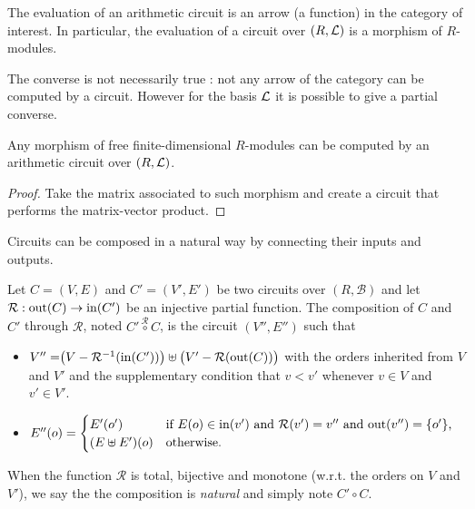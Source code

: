\begin{proposition}
  The evaluation of an arithmetic circuit is an arrow (a function) in
  the category of interest. In particular, the evaluation of a circuit
  over $(R,\mathcal{L})$ is a morphism of $R$-modules.
\end{proposition}

The converse is not necessarily true : not any arrow of the category
can be computed by a circuit. However for the basis $\mathcal{L}$ it is
possible to give a partial converse.

\begin{proposition}
  Any morphism of free finite-dimensional $R$-modules can be computed
  by an arithmetic circuit over $(R,\mathcal{L})$.
\end{proposition}
\begin{proof}
  Take the matrix associated to such morphism and create a circuit
  that performs the matrix-vector product.
\end{proof}

Circuits can be composed in a natural way by connecting their inputs
and outputs.

\begin{definition}
  Let $C=(V,E)$ and $C'=(V',E')$ be two circuits over
  $(R,\mathcal{B})$ and let $\mathcal{R}:\operatorname{out}(C)\rightarrow\operatorname{in}(C')$ be an injective
  partial function. The composition of $C$ and $C'$ through
  $\mathcal{R}$, noted $C'\overset{\mathcal{R}}{\circ}C$, is the
  circuit $(V'', E'')$ such that
  \begin{itemize}
  \item $V'' = \bigr(V - \mathcal{R}^{-1}(\operatorname{in}(C'))\bigr) \uplus
    \bigl(V' - \mathcal{R}(\operatorname{out}(C))\bigr)$ with the orders inherited
    from $V$ and $V'$ and the supplementary condition that $v<v'$
    whenever $v\in V$ and $v'\in V'$.
  \item $E''(o) = \begin{cases}
      E'(o') & \text{if $E(o)\in\operatorname{in}(v')$ and $\mathcal{R}(v') = v''$ and $\operatorname{out}(v'')=\{o'\}$,}\\
      (E\uplus E')(o) & \text{otherwise.}
    \end{cases}$
  \end{itemize}

  When the function $\mathcal{R}$ is total, bijective and monotone
  (w.r.t. the orders on $V$ and $V'$), we say the the composition is
  \emph{natural} and simply note $C'\circ C$.
\end{definition}


